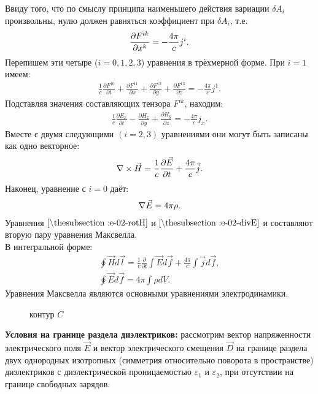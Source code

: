 \documentclass[__main__.tex]{subfiles}
\begin{document}
Ввиду того, что по смыслу принципа наименьшего действия вариации $\delta A_i$ произвольны, нулю должен равняться коэффициент при $\delta A_i$, т.е.
\begin{gather}
    \llabel{e-02-deltaF}
    \frac{\partial F^{ik}}{\partial x^k} = -\frac{4\pi}{c}j^i.
\end{gather}
Перепишем эти четыре ($i = 0, 1, 2, 3$) уравнения в трёхмерной форме. При $i=1$ имеем:
\begin{gather*}
    \frac{1}{c}\frac{\partial F^{10}}{\partial t} + \frac{\partial F^{11}}{\partial x} + \frac{\partial F^{12}}{\partial y} + \frac{\partial F^{13}}{\partial z} = -\frac{4\pi}{c}j^1.
\end{gather*}
Подставляя значения составляющих тензора $F^{ik}$, находим:
\begin{gather*}
    \frac{1}{c}\frac{\partial E_x}{\partial t} - \frac{\partial H_z}{\partial y} + \frac{\partial H_y}{\partial z} = -\frac{4\pi}{c}j_x.
\end{gather*}
Вместе с двумя следующими $(i = 2, 3)$ уравнениями они могут быть записаны как одно векторное:
\begin{gather}
    \llabel{e-02-rotH}
    \nabla\times\vec{H}=\frac{1}{c}\frac{\partial\vec{E}}{\partial t} + \frac{4\pi}{c}\vec{j}.
\end{gather}
Наконец, уравнение с $i=0$ даёт:
\begin{gather}
    \llabel{e-02-divE}
    \nabla\vec{E}=4\pi\rho.
\end{gather}
Уравнения $\lref{e-02-rotH}$ и $\lref{e-02-divE}$ и составляют вторую пару уравнения Максвелла.\\
В интегральной форме:\\
\begin{gather*}
    \oint\vec{H}d\vec{l}=\frac{1}{c}\frac{\partial}{\partial t}\int\vec{E}d\vec{f}+\frac{4\pi}{c}\int\vec{j}d\vec{f},\\
    \oint\vec{E}d\vec{f}=4\pi\int\rho{dV}.
\end{gather*}
Уравнения Максвелла являются основными уравнениями электродинамики.\\
\begin{wrapfigure}{r}{.3\linewidth}
    \centering
    \def\svgwidth{1\linewidth}
    
    \caption{контур $C$}
\end{wrapfigure}

\textbf{Условия на границе раздела диэлектриков:} рассмотрим вектор напряженности электрического поля $\vec{E}$ и вектор электрического смещения $\vec{D}$ на границе раздела двух однородных изотропных (симметрия относительно поворота в пространстве) диэлектриков с диэлектрической проницаемостью $\varepsilon_1$ и $\varepsilon_2$, при отсутствии на границе свободных зарядов.
\end{document}
